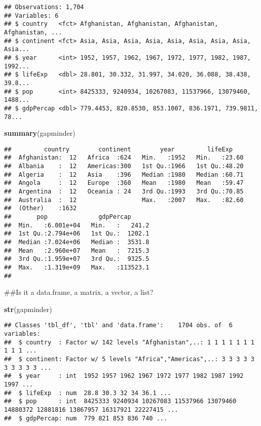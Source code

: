 \documentclass[]{article}
\newenvironment{Shaded}{\begin{snugshade}}{\end{snugshade}}
\newcommand{\KeywordTok}[1]{\textcolor[rgb]{0.13,0.29,0.53}{\textbf{#1}}}
\newcommand{\NormalTok}[1]{#1}
\begin{document}
\begin{verbatim}
## Observations: 1,704
## Variables: 6
## $ country   <fct> Afghanistan, Afghanistan, Afghanistan, Afghanistan, ...
## $ continent <fct> Asia, Asia, Asia, Asia, Asia, Asia, Asia, Asia, Asia...
## $ year      <int> 1952, 1957, 1962, 1967, 1972, 1977, 1982, 1987, 1992...
## $ lifeExp   <dbl> 28.801, 30.332, 31.997, 34.020, 36.088, 38.438, 39.8...
## $ pop       <int> 8425333, 9240934, 10267083, 11537966, 13079460, 1488...
## $ gdpPercap <dbl> 779.4453, 820.8530, 853.1007, 836.1971, 739.9811, 78...
\end{verbatim}

\begin{Shaded}
\begin{Highlighting}[]
\KeywordTok{summary}\NormalTok{(gapminder)}
\end{Highlighting}
\end{Shaded}

\begin{verbatim}
##         country        continent        year         lifeExp     
##  Afghanistan:  12   Africa  :624   Min.   :1952   Min.   :23.60  
##  Albania    :  12   Americas:300   1st Qu.:1966   1st Qu.:48.20  
##  Algeria    :  12   Asia    :396   Median :1980   Median :60.71  
##  Angola     :  12   Europe  :360   Mean   :1980   Mean   :59.47  
##  Argentina  :  12   Oceania : 24   3rd Qu.:1993   3rd Qu.:70.85  
##  Australia  :  12                  Max.   :2007   Max.   :82.60  
##  (Other)    :1632                                                
##       pop              gdpPercap       
##  Min.   :6.001e+04   Min.   :   241.2  
##  1st Qu.:2.794e+06   1st Qu.:  1202.1  
##  Median :7.024e+06   Median :  3531.8  
##  Mean   :2.960e+07   Mean   :  7215.3  
##  3rd Qu.:1.959e+07   3rd Qu.:  9325.5  
##  Max.   :1.319e+09   Max.   :113523.1  
## 
\end{verbatim}

\begin{Shaded}
\begin{Highlighting}[]
\NormalTok{##Is it a data.frame, a matrix, a vector, a list?}

\KeywordTok{str}\NormalTok{(gapminder)}
\end{Highlighting}
\end{Shaded}

\begin{verbatim}
## Classes 'tbl_df', 'tbl' and 'data.frame':    1704 obs. of  6 variables:
##  $ country  : Factor w/ 142 levels "Afghanistan",..: 1 1 1 1 1 1 1 1 1 1 ...
##  $ continent: Factor w/ 5 levels "Africa","Americas",..: 3 3 3 3 3 3 3 3 3 3 ...
##  $ year     : int  1952 1957 1962 1967 1972 1977 1982 1987 1992 1997 ...
##  $ lifeExp  : num  28.8 30.3 32 34 36.1 ...
##  $ pop      : int  8425333 9240934 10267083 11537966 13079460 14880372 12881816 13867957 16317921 22227415 ...
##  $ gdpPercap: num  779 821 853 836 740 ...
\end{verbatim}
\end{document}
